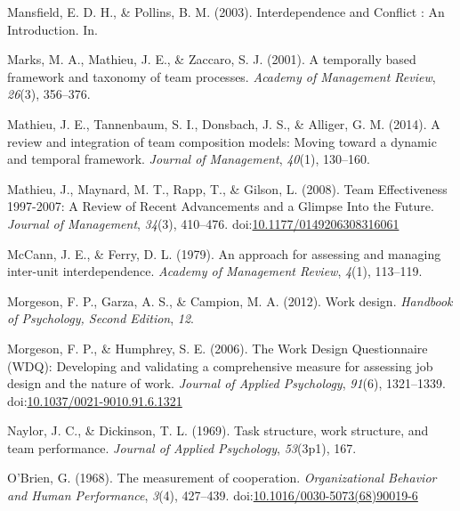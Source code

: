 \documentclass[english,,man]{apa6}
\theoremstyle{definition}
\theoremstyle{definition}
\theoremstyle{definition}
\theoremstyle{remark}
\begin{document}
\leavevmode\hypertarget{ref-mansfield_interdependence_2003}{}%
Mansfield, E. D. H., \& Pollins, B. M. (2003). Interdependence and
Conflict : An Introduction. In.

\leavevmode\hypertarget{ref-marks_temporally_2001}{}%
Marks, M. A., Mathieu, J. E., \& Zaccaro, S. J. (2001). A temporally
based framework and taxonomy of team processes. \emph{Academy of
Management Review}, \emph{26}(3), 356--376.

\leavevmode\hypertarget{ref-mathieu_review_2014}{}%
Mathieu, J. E., Tannenbaum, S. I., Donsbach, J. S., \& Alliger, G. M.
(2014). A review and integration of team composition models: Moving
toward a dynamic and temporal framework. \emph{Journal of Management},
\emph{40}(1), 130--160.

\leavevmode\hypertarget{ref-mathieu_team_2008}{}%
Mathieu, J., Maynard, M. T., Rapp, T., \& Gilson, L. (2008). Team
Effectiveness 1997-2007: A Review of Recent Advancements and a Glimpse
Into the Future. \emph{Journal of Management}, \emph{34}(3), 410--476.
doi:\href{https://doi.org/10.1177/0149206308316061}{10.1177/0149206308316061}

\leavevmode\hypertarget{ref-mccann_approach_1979}{}%
McCann, J. E., \& Ferry, D. L. (1979). An approach for assessing and
managing inter-unit interdependence. \emph{Academy of Management
Review}, \emph{4}(1), 113--119.

\leavevmode\hypertarget{ref-morgeson2012work}{}%
Morgeson, F. P., Garza, A. S., \& Campion, M. A. (2012). Work design.
\emph{Handbook of Psychology, Second Edition}, \emph{12}.

\leavevmode\hypertarget{ref-morgeson_work_2006}{}%
Morgeson, F. P., \& Humphrey, S. E. (2006). The Work Design
Questionnaire (WDQ): Developing and validating a comprehensive measure
for assessing job design and the nature of work. \emph{Journal of
Applied Psychology}, \emph{91}(6), 1321--1339.
doi:\href{https://doi.org/10.1037/0021-9010.91.6.1321}{10.1037/0021-9010.91.6.1321}

\leavevmode\hypertarget{ref-naylor1969task}{}%
Naylor, J. C., \& Dickinson, T. L. (1969). Task structure, work
structure, and team performance. \emph{Journal of Applied Psychology},
\emph{53}(3p1), 167.

\leavevmode\hypertarget{ref-obrien_measurement_1968}{}%
O'Brien, G. (1968). The measurement of cooperation. \emph{Organizational
Behavior and Human Performance}, \emph{3}(4), 427--439.
doi:\href{https://doi.org/10.1016/0030-5073(68)90019-6}{10.1016/0030-5073(68)90019-6}
\end{document}

